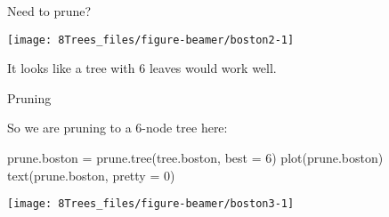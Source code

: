 \documentclass[
  10pt,
  ignorenonframetext,
]{beamer}
\newenvironment{Shaded}{\begin{snugshade}}{\end{snugshade}}
\newcommand{\AttributeTok}[1]{\textcolor[rgb]{0.77,0.63,0.00}{#1}}
\newcommand{\DecValTok}[1]{\textcolor[rgb]{0.00,0.00,0.81}{#1}}
\newcommand{\FunctionTok}[1]{\textcolor[rgb]{0.00,0.00,0.00}{#1}}
\newcommand{\NormalTok}[1]{#1}
\newcommand{\OtherTok}[1]{\textcolor[rgb]{0.56,0.35,0.01}{#1}}
\newcommand{\SpecialCharTok}[1]{\textcolor[rgb]{0.00,0.00,0.00}{#1}}
\newcommand{\StringTok}[1]{\textcolor[rgb]{0.31,0.60,0.02}{#1}}
\begin{document}
\begin{frame}[fragile]
\begin{block}{Need to prune?}
\protect\hypertarget{need-to-prune}{}
\(~\)

\scriptsize

\begin{Shaded}
\end{Shaded}

\begin{center}\texttt{[image: 8Trees\_files/figure-beamer/boston2-1]} \end{center}

\normalsize

\vspace{2mm}

It looks like a tree with 6 leaves would work well.
\end{block}
\end{frame}

\begin{frame}[fragile]
\begin{block}{Pruning}
\protect\hypertarget{pruning-1}{}
\vspace{1mm}

So we are pruning to a 6-node tree here:

\scriptsize

\begin{Shaded}
\begin{Highlighting}[]
\NormalTok{prune.boston }\OtherTok{=} \FunctionTok{prune.tree}\NormalTok{(tree.boston, }\AttributeTok{best =} \DecValTok{6}\NormalTok{)}
\FunctionTok{plot}\NormalTok{(prune.boston)}
\FunctionTok{text}\NormalTok{(prune.boston, }\AttributeTok{pretty =} \DecValTok{0}\NormalTok{)}
\end{Highlighting}
\end{Shaded}

\begin{center}\texttt{[image: 8Trees\_files/figure-beamer/boston3-1]} \end{center}
\end{block}
\end{frame}
\end{document}
